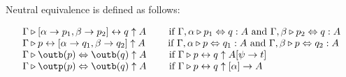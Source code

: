 \documentclass{article}
\begin{document}
\begin{definition}
  Neutral equivalence is defined as follows:

  \[
    \begin{array}{lr}
      \Gamma \triangleright [\alpha \to p_{1}, \beta \to p_{2}] \leftrightarrow q \uparrow A \qquad \text{ if } \Gamma, \alpha \triangleright p_{1} \Leftrightarrow q : A \text{ and } \Gamma, \beta \triangleright p_{2} \Leftrightarrow q : A \\

      \Gamma \triangleright p \leftrightarrow [\alpha \to q_{1}, \beta \to q_{2}] \uparrow A \qquad \text{ if } \Gamma, \alpha \triangleright p \Leftrightarrow q_{1} : A \text{ and } \Gamma, \beta \triangleright p \Leftrightarrow q_{2} : A \\

      \Gamma \triangleright \outb(p) \Leftrightarrow \outb(q) \uparrow A \qquad \text{ if } \Gamma \triangleright p \leftrightarrow q \uparrow A[\psi \to t]\\

      \Gamma \triangleright \outp(p) \Leftrightarrow \outb(q) \uparrow A \qquad \text{ if } \Gamma \triangleright p \leftrightarrow q \uparrow [\alpha] \to A\\

    \end{array}
  \]
\end{definition}
\end{document}
